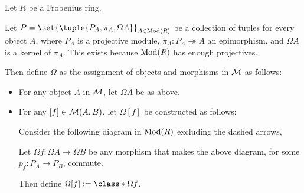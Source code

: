 \begin{definition}
    \label{def:stmod_omega}
    Let \( R \) be a Frobenius ring.

    Let \( P = \set{\tuple{P_A, \pi_A, \Omega A}}_{A \in \Mod(R)} \) be a collection of tuples for every object \( A \), where \( P_A \) is a projective module, \( \pi_A: P_A \twoheadrightarrow A \) an epimorphism, and \( \Omega A \) is a kernel of \( \pi_A \). This exists because \( \operatorname{Mod}(R) \) has enough projectives.

    Then define \( \Omega \) as the assignment of objects and morphisms in \( {\mathcal{M}} \) as follows:
    \begin{itemize}
        \item {
            For any object \( A \) in \( {\mathcal{M}} \), let \( \Omega A \) be as above.
        }
        \item {
            For any \( [f] \in {\mathcal{M}}(A, B) \), let \( \Omega [f] \) be constructed as follows:

            Consider the following diagram in \( \operatorname{Mod}(R) \) excluding the dashed arrows,
            \begin{center}
            \end{center}
            Let \( \Omega f: \Omega A \to \Omega B \) be any morphism that makes the above diagram, for some \( p_f: P_A \to P_B \), commute.

            Then define \( \Omega [f] := \class*{\Omega f} \).
        }
    \end{itemize}
\end{definition}

